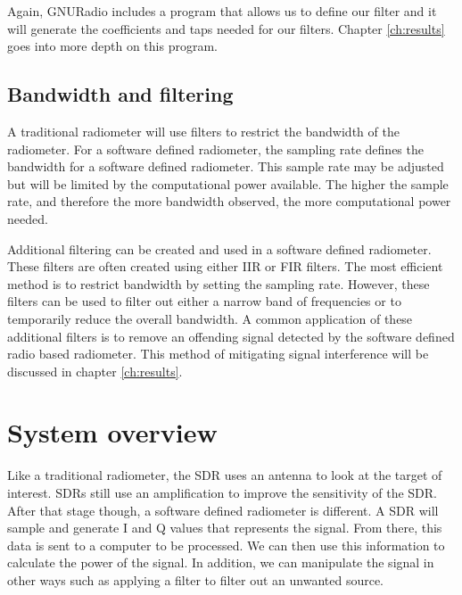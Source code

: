 Again, GNURadio includes a program that allows us to define our filter and it will generate the coefficients and taps needed for our filters.  Chapter \ref{ch:results} goes into more depth on this program.



\subsection{Bandwidth and filtering}
A traditional radiometer will use filters to restrict the bandwidth of the radiometer.  For a software defined radiometer, the sampling rate defines the bandwidth for a software defined radiometer.  This sample rate may be adjusted but will be limited by the computational power available.  The higher the sample rate, and therefore the more bandwidth observed, the more computational power needed.  

Additional filtering can be created and used in a software defined radiometer.  These filters are often created using either IIR or FIR filters.  The most efficient method is to restrict bandwidth by setting the sampling rate.  However, these filters can be used to filter out either a narrow band of frequencies or to temporarily reduce the overall bandwidth.  A common application of these additional filters is to remove an offending signal detected by the software defined radio based radiometer.  This method of mitigating signal interference will be discussed in chapter \ref{ch:results}.

\section{System overview}

Like a traditional radiometer, the SDR uses an antenna to look at the target of interest.  SDRs still use an amplification to improve the sensitivity of the SDR. After that stage though, a software defined radiometer is different.  A SDR will sample and generate I and Q values that represents the signal.  From there, this data is sent to a computer to be processed.  We can then use this information to calculate the power of the signal.  In addition, we can manipulate the signal in other ways such as applying a filter to filter out an unwanted source.

